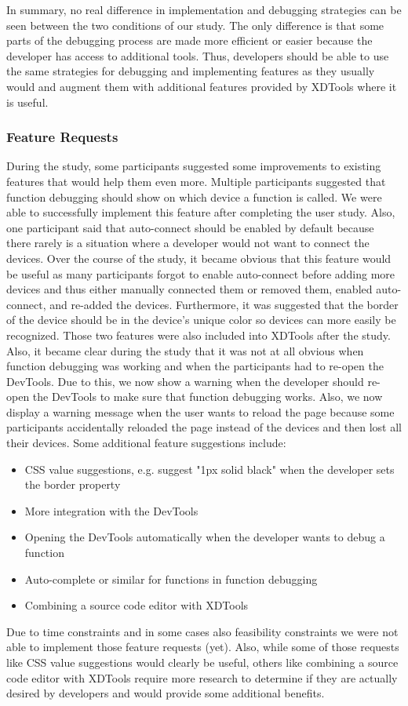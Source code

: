 In summary, no real difference in implementation and debugging strategies can be seen between the two conditions of our study. The only difference is that some parts of the debugging process are made more efficient or easier because the developer has access to additional tools. Thus, developers should be able to use the same strategies for debugging and implementing features as they usually would and augment them with additional features provided by XDTools where it is useful. 

\subsubsection{Feature Requests}

During the study, some participants suggested some improvements to existing features that would help them even more. Multiple participants suggested that function debugging should show on which device a function is called. We were able to successfully implement this feature after completing the user study. Also, one participant said that auto-connect should be enabled by default because there rarely is a situation where a developer would not want to connect the devices. Over the course of the study, it became obvious that this feature would be useful as many participants forgot to enable auto-connect before adding more devices and thus either manually connected them or removed them, enabled auto-connect, and re-added the devices. Furthermore, it was suggested that the border of the device should be in the device's unique color so devices can more easily be recognized. Those two features were also included into XDTools after the study. Also, it became clear during the study that it was not at all obvious when function debugging was working and when the participants had to re-open the DevTools. Due to this, we now show a warning when the developer should re-open the DevTools to make sure that function debugging works. Also, we now display a warning message when the user wants to reload the page because some participants accidentally reloaded the page instead of the devices and then lost all their devices. Some additional feature suggestions include:
\begin{itemize}
	\item CSS value suggestions, e.g. suggest "1px solid black" when the developer sets the border property
	\item More integration with the DevTools
	\item Opening the DevTools automatically when the developer wants to debug a function
	\item Auto-complete or similar for functions in function debugging
	\item Combining a source code editor with XDTools
\end{itemize}
Due to time constraints and in some cases also feasibility constraints we were not able to implement those feature requests (yet). Also, while some of those requests like CSS value suggestions would clearly be useful, others like combining a source code editor with XDTools require more research to determine if they are actually desired by developers and would provide some additional benefits.
